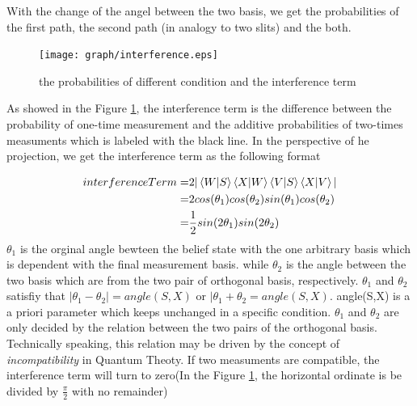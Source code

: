 \documentclass[11pt,notitlepage]{article}
\begin{document}
With the change of the angel between the two basis, we get the probabilities of the first path, the second path (in analogy to two slits) and the both. 
\begin{figure}[!htb]
\centering
\texttt{[image: graph/interference.eps]}
\caption{the probabilities of different condition and the interference term}
\label{fig:interference_real}
\end{figure}
As showed in the Figure \ref{fig:interference_real}, the interference term is the difference between the probability of one-time measurement and the additive probabilities of two-times measuments which is labeled with the black line.
In the perspective of he projection, we get the interference term as the following format

\begin{equation}
\begin{split}
interferenceTerm=&2\vert \braket{W|S} \braket{X|W} \braket{V|S} \braket{X|V} \vert \\
=&2cos(\theta_1)cos(\theta_2)sin(\theta_1)cos(\theta_2) \\
=&\frac{1}{2}sin(2\theta_1)sin(2\theta_2)
\end{split}
\label{eq:interference_term_in_projection}
\end{equation}
$\theta_1$ is the orginal angle bewteen the belief state with the one arbitrary basis which is dependent with the final measurement basis. while $\theta_2$ is the angle between the two basis which are from the two pair of orthogonal basis, respectively. $\theta_1$ and $\theta_2$ satisfiy that $\vert \theta_1 -\theta_2 \vert = angle(S,X)$ or $\vert \theta_1+\theta_2=angle(S,X)$. angle(S,X) is a a priori parameter which keeps unchanged in a specific condition. $\theta_1$ and $\theta_2$ are only decided by the relation between the two pairs of the orthogonal basis. Technically speaking, this relation may be driven by the concept of {\em{incompatibility}} in Quantum Theoty. If two measuments are compatible, the interference term will turn to zero(In the Figure \ref{fig:interference_real}, the horizontal ordinate is be divided by $\frac{\pi}{2}$ with no remainder)
\end{document}
